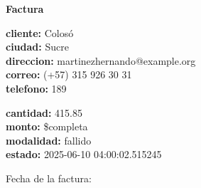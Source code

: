 \documentclass{article}
\begin{document}
\begin{center}
    {\LARGE \textbf{Factura}}\\[1cm]
\end{center}

\textbf{cliente:} Colosó \\
\textbf{ciudad:} Sucre \\
\textbf{direccion:} martinezhernando@example.org \\
\textbf{correo:} (+57) 315 926 30 31 \\
\textbf{telefono:} 189 \\

\vspace{0.5cm}

\textbf{cantidad:} 415.85 \\
\textbf{monto:} \$completa \\
\textbf{modalidad:} fallido \\
\textbf{estado:} 2025-06-10 04:00:02.515245 \\

\vspace{1cm}

Fecha de la factura: 
\end{document}
